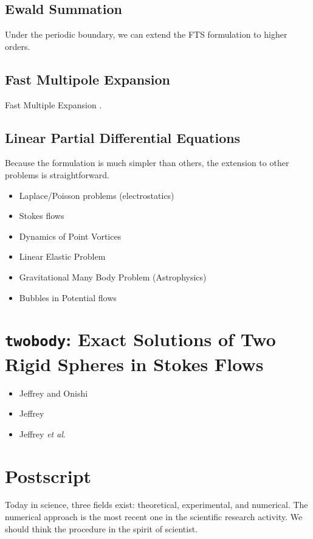 \documentclass{book}
\begin{document}
\section{Ewald Summation}
Under the periodic boundary,
we can extend the FTS formulation to higher orders.



\section{Fast Multipole Expansion}
Fast Multiple Expansion
\cite{greengard,greengard1987}.




\section{Linear Partial Differential Equations}
Because the formulation is much simpler than others,
the extension to other problems is straightforward.

\begin{itemize}
\item Laplace/Poisson problems (electrostatics)
\item Stokes flows
\item Dynamics of Point Vortices
\item Linear Elastic Problem
\item Gravitational Many Body Problem (Astrophysics)
\item Bubbles in Potential flows
\end{itemize}



\chapter{{\tt twobody}:
  Exact Solutions of Two Rigid Spheres in Stokes Flows}
\label{chp:twobody}

\begin{itemize}
\item Jeffrey and Onishi\cite{JeffreyOnishi1984}
\item Jeffrey\cite{jeffrey1992}
\item Jeffrey {\it et al}.\cite{jeffrey1993}
\end{itemize}



\chapter{Postscript}
Today in science, three fields exist:
theoretical, experimental, and numerical.
The numerical approach is the most recent one
in the scientific research activity.
We should think the procedure in the spirit of scientist.
\end{document}
